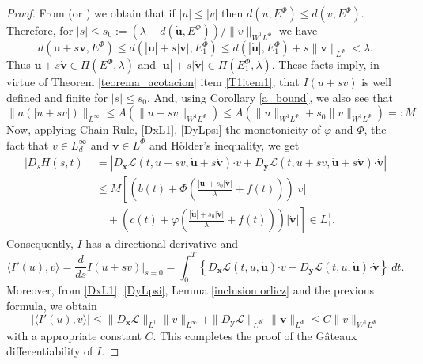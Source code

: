\documentclass[twoside]{article}
\theoremstyle{remark}
\newcommand{\orlnor}{\|_{L^{\Phi}}}
\newcommand{\linf}{\|_{L^{\infty}}}
\newcommand{\lphi}{L^{\Phi}}
\newcommand{\lpsi}{L^{\Phi^*}}
\newcommand{\ephi}{E^{\Phi}}
\newcommand{\sobnor}{\|_{W^{1}\lphi}}
\renewcommand{\b}[1]{\boldsymbol{#1}}
\newcommand{\ccdot}{\b{\cdot}}
\renewcommand{\leq}{\leqslant}
\begin{document}
\begin{proof}
From \cite[Lemma 10.1]{KR} (or \cite[Thm. 5.5]{Orliczvectorial2005} ) we obtain that if $|u|\leq |v|$ then    $d(u,\ephi)\leq d(v,\ephi)$.
Therefore, for  $|s|\leq s_0:=\left(\lambda-d(\b{\dot{u}},\ephi)\right)/\|v\sobnor$ we have
\[
d \left(\b{\dot{u}}+s\b{\dot{v}}, \ephi \right)
\leq
d \left(|\b{\dot{u}}|+s|\b{\dot{v}}|, \ephi_1 \right)
\leq d \left(|\b{\dot{u}}|,\ephi_1 \right)+ s \|\b{\dot{v}}\orlnor < \lambda.
\]
Thus $\b{\dot{u}}+s\b{\dot{v}} \in \Pi(\ephi,\lambda)$ and  $|\b{\dot{u}}|+s|\b{\dot{v}}| \in \Pi(\ephi_1,\lambda)$. These facts imply, in virtue of Theorem \ref{teorema_acotacion} item \ref{T1item1}, that $I(u+sv)$ is well defined and finite for $|s|\leq s_0$.
And, using  Corollary \ref{a_bound}, we also see that
\[ \|a(|u+sv|)\|_{L^{\infty}}\leq  A(\|u+sv\sobnor)\leq
 A(\|u\sobnor+s_0\|v\sobnor)=:M
\]
Now, applying Chain Rule, \eqref{DxL1}, \eqref{DyLpsi} the monotonicity of $\varphi$ and $\Phi$, 
the fact that $v\in L^{\infty}_d$ and $\b{\dot{v}}\in\lphi$ and H\"older's inequality, we get
\begin{equation}\label{ctg}
\begin{split}
|D_s H(s,t)|&=\left| D_{\b{x}}\mathcal{L}(t,u+sv,\b{\dot{u}}+s\b{\dot{v}})\ccdot v +  D_{\b{y}}\mathcal{L}(t,u+sv,\b{\dot{u}}+s\b{\dot{v}})\ccdot\b{\dot{v}}\right| \\
 & \leq M \left[\left( b(t)+ \Phi\left(\frac{|\b{\dot{u}}|+s_0|\b{\dot{v}}|}{\lambda}+f(t)\right)\right)|v|\right.\\
&\left. \quad+ \left(c(t)+ \varphi\left (\frac{|\b{\dot{u}}|+s_0|\b{\dot{v}}|}{\lambda}+f(t)\right)\right)|\b{\dot{v}}| \right]\in L^1_1.
\end{split}
\end{equation}
Consequently, $I$ has a directional derivative and
\[
\langle I'(u),v \rangle=\frac{d}{ds}I(u+sv)\big|_{s=0}=\int_0^T
\left\{D_{\b{x}}\mathcal{L}(t,u,\b{\dot{u}})\ccdot v+ D_{\b{y}}\mathcal{L}(t,u,\b{\dot{u}})\ccdot\b{\dot{v}}\right\} \ dt.
\]
Moreover, from \eqref{DxL1}, \eqref{DyLpsi}, Lemma \ref{inclusion orlicz} and the previous formula, we obtain
\[
|\langle I'(u),v \rangle| \leq \|D_{\b{x}}\mathcal{L}\|_{L^1} \| v\linf +
\|D_{\b{y}}\mathcal{L}\|_{\lpsi} \|\b{\dot{v}}\orlnor \leq C \|v\sobnor
\]
with a appropriate constant $C$.
This completes the proof of the G\^ateaux differentiability of $I$. 


\end{proof}
\end{document}
